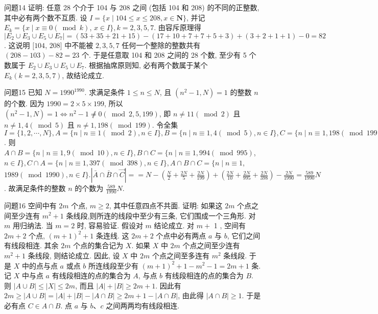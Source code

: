 问题14 证明: 任意 28 个介于 104 与 208 之间 (包括 104 和 208) 的不同的正整数,其中必有两个数不互质.
设 $I=\{x \mid 104 \leqslant x \leqslant 208, x \in \mathbf{N}\}$, 并记 $E_k=\{x \mid x \equiv 0(\bmod k)$, $x \in I\}, k=2,3,5,7$. 由容斥原理得 $\left|E_2 \cup E_3 \cup E_5 \cup E_7\right|=(53+35+ 21+15)-(17+10+7+7+5+3)+(3+2+1+1)-0=82$. 这说明 $[104$, $208]$ 中不能被 $2,3,5,7$ 任何一个整除的整数共有 $(208-103)-82=23$ 个.
于是任意取 104 和 208 之间的 28 个数, 至少有 5 个数属于 $E_2 \cup E_3 \cup E_5 \cup E_7$. 根据抽席原则知, 必有两个数属于某个 $E_k(k=2,3,5,7)$, 故结论成立.



问题15 已知 $N=1990^{1990}$. 求满足条件 $1 \leqslant n \leqslant N$, 且 $\left(n^2-1, N\right)=1$ 的整数 $n$ 的个数.
因为 $1990=2 \times 5 \times 199$, 所以 $\left(n^2-1, N\right)=1 \Leftrightarrow n^2-1 \not \neq 0(\bmod 2,5,199)$, 即 $n \neq 11(\bmod 2)$ 且 $n \neq 1,4(\bmod 5)$ 且 $n \neq 1,198(\bmod 199)$.
令全集 $I=\{1,2, \cdots, N\}, A=\{n \mid n \equiv 1(\bmod 2), n \in I\}, B= \{n \mid n \equiv 1,4(\bmod 5), n \in I\}, C=\{n \mid n \equiv 1,198(\bmod 199), n \in I\}$. 则 $A \cap B=\{n \mid n \equiv 1,9(\bmod 10), n \in I\}, B \cap C=\{n \mid n \equiv 1,994(\bmod 995)$, $n \in I\}, C \cap A=\{n \mid n \equiv 1,397(\bmod 398), n \in I\}, A \cap B \cap C=\{n \mid n \equiv 1$, $1989(\bmod 1990), n \in I\} .|\bar{A} \cap \bar{B} \cap \vec{C}|==N-\left(\frac{N}{2}+\frac{2 N}{5}+\frac{2 N}{199}\right)+ \left(\frac{2 N}{10}+\frac{2 N}{995}+\frac{2 N}{398}\right)-\frac{2 N}{1990}=\frac{589}{1990} N$. 故满足条件的整数 $n$ 的个数为 $\frac{589}{1990} N$.



问题16 空间中有 $2 m$ 个点, $m \geqslant 2$, 其中任意四点不共面.
证明: 如果这 $2 m$ 个点之间至少连有 $m^2+1$ 条线段,则所连的线段中至少有三条, 它们围成一个三角形.
对 $m$ 用归纳法.
当 $m=2$ 时, 容易验证.
假设对 $m$ 结论成立.
对 $m+$ 1 , 空间有 $2 m+2$ 个点, $(m+1)^2+1$ 条连线.
这 $2 m+2$ 个点中必有两点 $a$ 与 $b$, 它们之间有线段相连.
其余 $2 m$ 个点的集合记为 $X$. 如果 $X$ 中 $2 m$ 个点之间至少连有 $m^2+1$ 条线段, 则结论成立.
因此, 设 $X$ 中 $2 m$ 个点之间至多连有 $m^2$ 条线段.
于是 $X$ 中的点与点 $a$ 或点 $b$ 所连线段至少有 $(m+1)^2+1-m^2-1= 2 m+1$ 条.
记 $X$ 中与点 $a$ 有线段相连的点的集合为 $A$, 与点 $b$ 有线段相连的点的集合为 $B$. 则 $|A \cup B| \leqslant|X| \leqslant 2 m$, 而且 $|A|+|B| \geqslant 2 m+1$. 因此有 $2 m \geqslant|A \cup B|=|A|+|B|-|A \cap B| \geqslant 2 m+1-|A \cap B|$, 由此得 $|A \cap B| \geqslant 1$. 于是必有点 $C \in A \cap B$. 点 $a$ 与 $b 、 c$ 之间两两均有线段相连.



